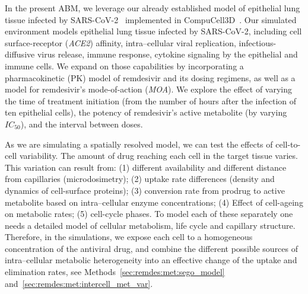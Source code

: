 In the present ABM, we leverage our already established model of epithelial lung tissue infected by SARS-CoV-2~\cite{sego_modular_2020} implemented in CompuCell3D~\cite{swat_multi-scale_2012}. Our simulated environment models epithelial lung tissue infected by SARS-CoV-2, including cell surface-receptor (\emph{ACE2}) affinity, intra--cellular viral replication, infectious-diffusive virus release, immune response, cytokine signaling by the epithelial and immune cells. We expand on those capabilities by incorporating a pharmacokinetic (PK) model of remdesivir and its dosing regimens, as well as a model for remdesivir's mode-of-action (\emph{MOA}). We explore the effect of varying the time of treatment initiation (from the number of hours after the infection of ten epithelial cells), the potency of remdesivir's active metabolite (by varying $IC_{50}$), and the interval between doses.

As we are simulating a spatially resolved model, we can test the effects of cell-to-cell variability. The amount of drug reaching each cell in the target tissue varies. This variation can result from: (1) different availability and different distance from capillaries (microdosimetry); (2) uptake rate differences (density and dynamics of cell-surface proteins); (3) conversion rate from prodrug to active metabolite based on intra--cellular enzyme concentrations; (4) Effect of cell-ageing on metabolic rates; (5) cell-cycle phases. To model each of these separately one needs a detailed model of cellular metabolism, life cycle and capillary structure. Therefore, in the simulations, we expose each cell to a homogeneous concentration of the antiviral drug, and combine the different possible sources of intra--cellular metabolic heterogeneity into an effective change of the uptake and elimination rates, see Methods~\ref{sec:remdes:met:sego_model} and~\ref{sec:remdes:met:intercell_met_var}.




